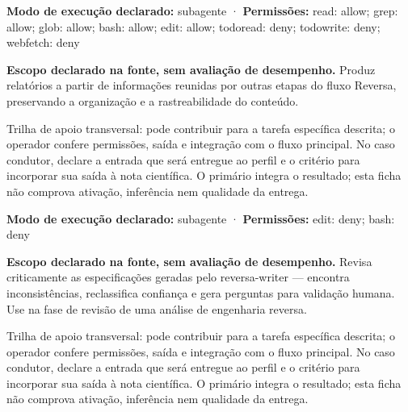 \begin{arquitetura}
\textbf{Modo de execução declarado:} subagente · \textbf{Permissões:} read: allow; grep: allow; glob: allow; bash: allow; edit: allow; todoread: deny; todowrite: deny; webfetch: deny
\end{arquitetura}


\begin{descricao}
\textbf{Escopo declarado na fonte, sem avaliação de desempenho.}
Produz relatórios a partir de informações reunidas por outras etapas do fluxo Reversa, preservando a organização e a rastreabilidade do conteúdo.
\end{descricao}

\begin{funcao}
Trilha de apoio transversal: pode contribuir para a tarefa específica descrita; o operador confere permissões, saída e integração com o fluxo principal. No caso condutor, declare a entrada que será entregue ao perfil e o critério para incorporar sua saída à nota científica. O primário integra o resultado; esta ficha não comprova ativação, inferência nem qualidade da entrega.
\end{funcao}

\begin{arquitetura}
\textbf{Modo de execução declarado:} subagente · \textbf{Permissões:} edit: deny; bash: deny
\end{arquitetura}


\begin{descricao}
\textbf{Escopo declarado na fonte, sem avaliação de desempenho.}
Revisa criticamente as especificações geradas pelo reversa-writer — encontra inconsistências, reclassifica confiança e gera perguntas para validação humana. Use na fase de revisão de uma análise de engenharia reversa.
\end{descricao}

\begin{funcao}
Trilha de apoio transversal: pode contribuir para a tarefa específica descrita; o operador confere permissões, saída e integração com o fluxo principal. No caso condutor, declare a entrada que será entregue ao perfil e o critério para incorporar sua saída à nota científica. O primário integra o resultado; esta ficha não comprova ativação, inferência nem qualidade da entrega.
\end{funcao}

